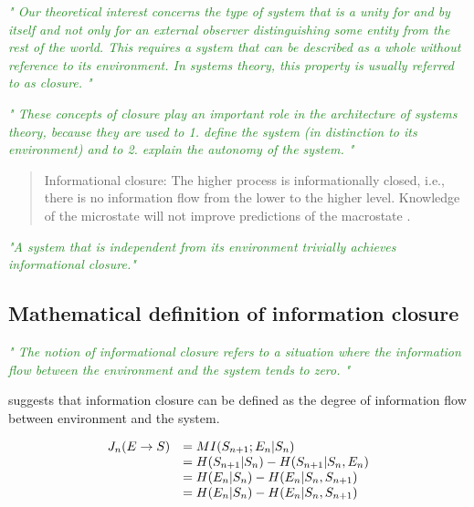\documentclass[utf8]{article}
\newcommand{\rewrite}[1]{\textcolor{ForestGreen}{\textit{"#1"}}}
\begin{document}
		\rewrite{
			Our theoretical interest concerns the type of system that is a unity for and by itself and not only for an external observer distinguishing some entity from the rest of the world. This requires a system that can be described as a whole without reference to its environment. In systems theory, this property is usually referred to as closure.
		}\citep{BERTSCHINGER.2006}
		
		
		\rewrite{
			These concepts of closure play an important role in the architecture of systems
			theory, because they are used to
			1. define the system (in distinction to its environment) and to 
			2. explain the autonomy of the system.
		}
		
		
		\begin{quotation}
			Informational closure: The higher process is informationally closed, i.e., there is no information flow from the lower to the higher level. Knowledge of the microstate will not improve predictions of the macrostate \citep[p. 4]{PFANTE.2014}.
		\end{quotation}
		
		
		\rewrite{A system that is independent from its environment trivially achieves informational 
			closure.}
		\citep{BERTSCHINGER.2006}
		
		
		
		\subsection{Mathematical definition of information closure}
			\rewrite{
				The notion of informational closure refers to a situation where the information flow between the environment and the system tends to zero.
			}\cite{BERTSCHINGER.2006}
		
			suggests that information closure can be defined as the degree of information flow between environment and the system. 
	
		
		\begin{equation}
			 \left.\begin{array} { r l } { J _ { n } ( E \rightarrow S ) } & { = M I ( S _ { n + 1} ; E _ { n } | S _ { n } ) } \\ { } & { = H ( S _ { n + 1} | S _ { n } ) - H ( S _ { n + 1} | S _ { n } ,E _ { n } ) } \\ { } & { = H ( E _ { n } | S _ { n } ) - H ( E _ { n } | S _ { n } ,S _ { n + 1} ) } \\ { } & { = H ( E _ { n } | S _ { n } ) - H ( E _ { n } | S _ { n } ,S _ { n + 1} ) } \end{array} \right.
		\end{equation}
		
\end{document}
